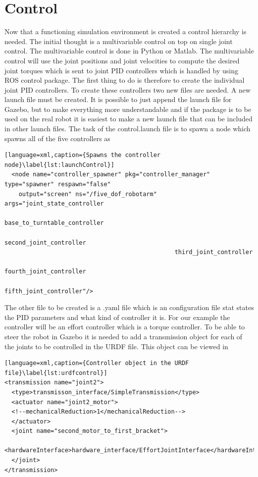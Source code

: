\section*{Control}

Now that a functioning simulation environment is created a control hierarchy is needed. The initial thought is a multivariable control on top on single joint control. The multivariable control is done in Python or Matlab. The multivariable control will use the joint positions and joint velocities to compute the desired joint torques which is sent to joint PID controllers which is handled by using ROS control package. The first thing to do is therefore to create the individual joint PID controllers. 
To create these controllers two new files are needed. A new launch file must be created. It is possible to just append the launch file for Gazebo, but to make everything more understandable and if the package is to be used on the real robot it is easiest to make a new launch file that can be included in other launch files. The task of the control.launch file is to spawn a node which spawns all of the five controllers as 
\begin{lstlisting}[language=xml,caption={Spawns the controller node}\label{lst:launchControl}]
  <node name="controller_spawner" pkg="controller_manager" type="spawner" respawn="false"
	output="screen" ns="/five_dof_robotarm" args="joint_state_controller
                                                base_to_turntable_controller
                                                second_joint_controller
                                                third_joint_controller
                                                fourth_joint_controller
                                                fifth_joint_controller"/>
\end{lstlisting}


The other file to be created is a .yaml file which is an configuration file stat states the PID parameters and what kind of controller it is. For our example the controller will be an effort controller which is a torque controller. To be able to steer the robot in Gazebo it is needed to add a transmission object for each of the joints to be controlled in the URDF file. This object can be viewed in 

\begin{lstlisting}[language=xml,caption={Controller object in the URDF file}\label{lst:urdfcontrol}]
<transmission name="joint2">
  <type>transmisson_interface/SimpleTransmission</type>
  <actuator name="joint2_motor">
  <!--mechanicalReduction>1</mechanicalReduction-->
  </actuator>
  <joint name="second_motor_to_first_bracket">
    <hardwareInterface>hardware_interface/EffortJointInterface</hardwareInterface>
  </joint>
</transmission>
\end{lstlisting}




